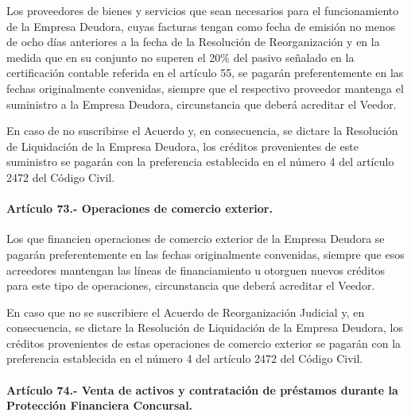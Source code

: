 \documentclass[
]{book}
\begin{document}
Los proveedores de bienes y servicios que sean necesarios para el funcionamiento de la Empresa Deudora, cuyas facturas tengan como fecha de emisión no menos de ocho días anteriores a la fecha de la Resolución de Reorganización y en la medida que en su conjunto no superen el 20\% del pasivo señalado en la certificación contable referida en el artículo 55, se pagarán preferentemente en las fechas originalmente convenidas, siempre que el respectivo proveedor mantenga el suministro a la Empresa Deudora, circunstancia que deberá acreditar el Veedor.

En caso de no suscribirse el Acuerdo y, en consecuencia, se dictare la Resolución de Liquidación de la Empresa Deudora, los créditos provenientes de este suministro se pagarán con la preferencia establecida en el número 4 del artículo 2472 del Código Civil.

\hypertarget{artuxedculo-73.--operaciones-de-comercio-exterior.}{%
\paragraph*{Artículo 73.- Operaciones de comercio exterior.}\label{artuxedculo-73.--operaciones-de-comercio-exterior.}}

Los que financien operaciones de comercio exterior de la Empresa Deudora se pagarán preferentemente en las fechas originalmente convenidas, siempre que esos acreedores mantengan las líneas de financiamiento u otorguen nuevos créditos para este tipo de operaciones, circunstancia que deberá acreditar el Veedor.

En caso que no se suscribiere el Acuerdo de Reorganización Judicial y, en consecuencia, se dictare la Resolución de Liquidación de la Empresa Deudora, los créditos provenientes de estas operaciones de comercio exterior se pagarán con la preferencia establecida en el número 4 del artículo 2472 del Código Civil.

\hypertarget{artuxedculo-74.--venta-de-activos-y-contrataciuxf3n-de-pruxe9stamos-durante-la-protecciuxf3n-financiera-concursal.}{%
\paragraph*{Artículo 74.- Venta de activos y contratación de préstamos durante la Protección Financiera Concursal.}\label{artuxedculo-74.--venta-de-activos-y-contrataciuxf3n-de-pruxe9stamos-durante-la-protecciuxf3n-financiera-concursal.}}
\end{document}
